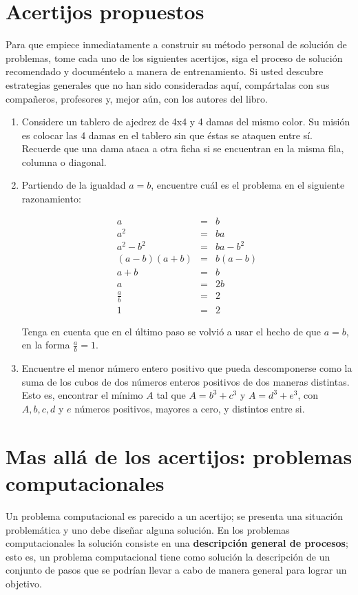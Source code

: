 \section{Acertijos propuestos}

Para que empiece inmediatamente a construir su método personal de
solución de problemas, tome cada uno de los siguientes acertijos,
siga el proceso de solución recomendado y documéntelo a manera de
entrenamiento. Si usted descubre estrategias generales que no han
sido consideradas aquí, compártalas con sus compañeros, profesores
y, mejor aún, con los autores del libro.
\begin{enumerate}
\item Considere un tablero de ajedrez de 4x4 y 4 damas del mismo color.
Su misión es colocar las 4 damas en el tablero sin que éstas se ataquen
entre sí. Recuerde que una dama ataca a otra ficha si se encuentran
en la misma fila, columna o diagonal.
\item Partiendo de la igualdad $a=b$, encuentre cuál es el problema en
el siguiente razonamiento:

\begin{eqnarray*}
a & = & b\\
a^{2} & = & ba\\
a^{2}-b^{2} & = & ba-b^{2}\\
(a-b)(a+b) & = & b(a-b)\\
a+b & = & b\\
a & = & 2b\\
\frac{a}{b} & = & 2\\
1 & = & 2
\end{eqnarray*}

Tenga en cuenta que en el último paso se volvió a usar el hecho de
que $a=b$, en la forma $\frac{a}{b}=1$.
\item Encuentre el menor número entero positivo que pueda descomponerse
como la suma de los cubos de dos números enteros positivos de dos
maneras distintas. Esto es, encontrar el mínimo $A$ tal que $A=b^{3}+c^{3}$
y $A=d^{3}+e^{3}$, con $A,b,c,d$ y $e$ números positivos, mayores
a cero, y distintos entre si.
\end{enumerate}

\section{Mas allá de los acertijos: problemas computacionales}


Un problema computacional es parecido a un acertijo; se presenta una
situación problemática y uno debe diseñar alguna solución. En los
problemas computacionales la solución consiste en una \textbf{descripción
general de procesos}; esto es, un problema computacional tiene como
solución la descripción de un conjunto de pasos que se podrían llevar
a cabo de manera general para lograr un objetivo.

